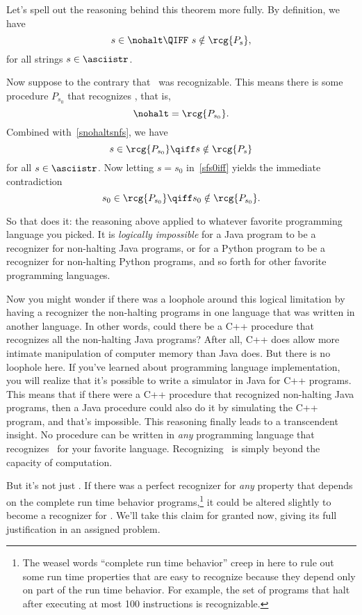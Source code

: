 Let's spell out the reasoning behind this theorem more fully.  By
definition, we have
\begin{equation}\label{snohaltsnfs}
s \in \nohalt \QIFF\ s \notin \rcg{P_s},
\end{equation}
for all strings $s \in \asciistr$.

Now suppose to the contrary that \nohalt\ was recognizable.  This
means there is some procedure $P_{s_0}$ that recognizes \nohalt, that is,
\[
\nohalt = \rcg{P_{s_0}}.
\]
Combined with~\eqref{snohaltsnfs}, we have
\begin{equation}\label{sfs0iff}
s \in \rcg{P_{s_0}} \qiff s \notin \rcg{P_s}
\end{equation}
for all $s \in \asciistr$.  Now letting $s = s_0$ in~\eqref{sfs0iff}
yields the immediate contradiction
\[
s_0 \in \rcg{P_{s_0}} \qiff s_0 \notin \rcg{P_{s_0}}.
\]

So that does it: the reasoning above applied to whatever favorite
programming language you picked.  It is \emph{logically impossible}
for a Java program to be a recognizer for non-halting Java programs,
or for a Python program to be a recognizer for non-halting Python
programs, and so forth for other favorite programming languages.

Now you might wonder if there was a loophole around this logical
limitation by having a recognizer the non-halting programs in one
language that was written in another language.  In other words, could
there be a C++ procedure that recognizes all the non-halting Java
programs?  After all, C++ does allow more intimate manipulation of
computer memory than Java does.  But there is no loophole here.  If
you've learned about programming language implementation, you will
realize that it's possible to write a simulator in Java for C++
programs.  This means that if there were a C++ procedure that
recognized non-halting Java programs, then a Java procedure could also
do it by simulating the C++ program, and that's impossible.  This
reasoning finally leads to a transcendent insight.  No procedure can
be written in \emph{any} programming language that recognizes
\nohalt\ for your favorite language.  Recognizing \nohalt\ is simply
beyond the capacity of computation.

But it's not just \nohalt.  If there was a perfect recognizer for
\emph{any} property that depends on the complete run time behavior
programs,\footnote{ The weasel words ``complete run time behavior''
  creep in here to rule out some run time properties that are easy to
  recognize because they depend only on part of the run time behavior.
  For example, the set of programs that halt after executing at most
  100 instructions is recognizable.} it could be altered slightly to
become a recognizer for \nohalt.  We'll take this claim for granted
now, giving its full justification in an assigned problem.

